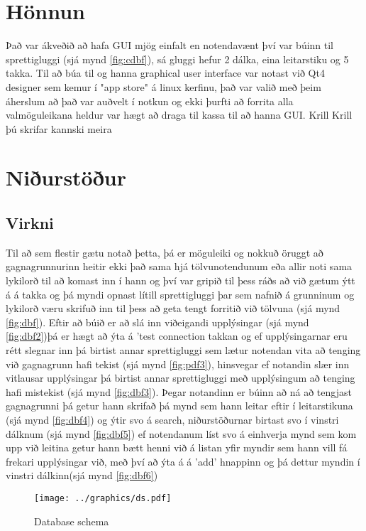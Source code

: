 \documentclass[12pt, git, final]{rureport}
\begin{document}
\section{Hönnun}
Það var ákveðið að hafa GUI mjög einfalt en notendavænt því var búinn til sprettigluggi (sjá mynd \ref{fig:cdbf}), sá gluggi hefur 2 dálka, eina leitarstiku og 5 takka. Til að búa til og hanna graphical user interface var notast við Qt4 designer sem kemur í "app store" á linux kerfinu, það var valið með þeim áherslum að það var auðvelt í notkun og ekki þurfti að forrita alla valmöguleikana heldur var hægt að draga til kassa til að hanna GUI. Krill Krill þú skrifar kannski meira 

\section{Niðurstöður}\label{nidurstodur}
\subsection {Virkni}
Til að sem flestir gætu notað þetta, þá er möguleiki og nokkuð öruggt að gagnagrunnurinn heitir ekki það sama hjá tölvunotendunum eða allir noti sama lykilorð til að komast inn í hann og því var gripið til þess ráðs að við gætum ýtt á á takka og þá myndi opnast lítill sprettigluggi þar sem nafnið á grunninum og lykilorð væru skrifuð inn til þess að geta tengt forritið við tölvuna (sjá mynd \ref{fig:dbf}).
Eftir að búið er að slá inn viðeigandi upplýsingar (sjá mynd \ref{fig:dbf2})þá er hægt að ýta á 'test connection takkan og ef upplýsingarnar eru rétt slegnar inn þá birtist annar sprettigluggi sem lætur notendan vita að tenging við gagnagrunn hafi tekist (sjá mynd \ref{fig:pdf3}), hinsvegar ef notandin slær inn vitlausar upplýsingar þá birtist annar sprettigluggi með upplýsingum að tenging hafi mistekist (sjá mynd \ref {fig:dbf3}).
\newline
\newline
Þegar notandinn er búinn að ná að tengjast gagnagrunni þá getur hann skrifað þá mynd sem hann leitar eftir í leitarstikuna (sjá mynd \ref{fig:dbf4}) og ýtir svo á search, niðurstöðurnar birtast svo í vinstri dálknum (sjá mynd \ref{fig:dbf5}) ef notendanum líst svo á einhverja mynd sem kom upp við leitina  getur hann bætt henni við á listan yfir myndir sem hann vill fá frekari upplýsingar við, með því að ýta á á 'add' hnappinn og þá dettur myndin í vinstri dálkinn(sjá mynd \ref{fig:dbf6})

\pagebreak
\begin{figure}
	\centering 
	\texttt{[image: ../graphics/ds.pdf]}
	\caption{Database schema \label{fig:dataschema}}
\end{figure}
\end{document}
